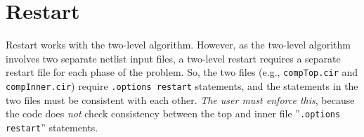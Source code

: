 \section{Restart}
\label{twolevel_restart}
Restart works with the two-level algorithm. However, as the two-level algorithm
involves two separate netlist input files, a two-level restart requires a
separate restart file for each phase of the problem. So, the two files (e.g.,
\texttt{compTop.cir} and \texttt{compInner.cir}) require \texttt{.options
restart} statements, and the statements in the two files must be consistent
with each other.  \emph{The user must enforce this}, because the \Xyce{} code does \emph{not}
check consistency between the top and inner file
''\texttt{.options restart}'' statements.


